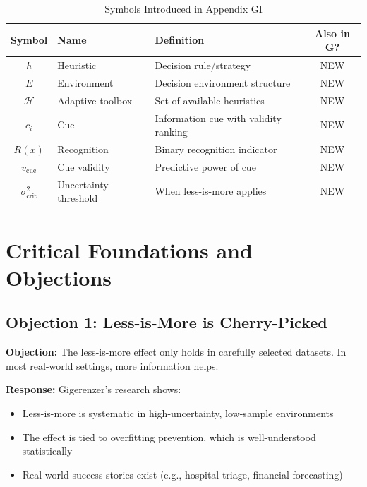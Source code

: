 \vspace{0.5em}

\begin{table}[htbp]
\centering
\caption{Symbols Introduced in Appendix GI}
\label{tab:gi-symbols}
\renewcommand{\arraystretch}{1.3}
\begin{tabular}{@{}clp{6cm}c@{}}
\toprule
\textbf{Symbol} & \textbf{Name} & \textbf{Definition} & \textbf{Also in G?} \\
\midrule
$h$ & Heuristic & Decision rule/strategy & NEW \\
$E$ & Environment & Decision environment structure & NEW \\
$\mathcal{H}$ & Adaptive toolbox & Set of available heuristics & NEW \\
$c_i$ & Cue & Information cue with validity ranking & NEW \\
$R(x)$ & Recognition & Binary recognition indicator & NEW \\
$v_{\text{cue}}$ & Cue validity & Predictive power of cue & NEW \\
$\sigma^2_{\text{crit}}$ & Uncertainty threshold & When less-is-more applies & NEW \\
\bottomrule
\end{tabular}
\end{table}


\section{Critical Foundations and Objections}
\label{sec:gi-foundations}

\subsection{Objection 1: Less-is-More is Cherry-Picked}

\textbf{Objection:} The less-is-more effect only holds in carefully selected datasets. In most real-world settings, more information helps.

\textbf{Response:} Gigerenzer's research shows:
\begin{itemize}[nosep]
\item Less-is-more is systematic in high-uncertainty, low-sample environments
\item The effect is tied to overfitting prevention, which is well-understood statistically
\item Real-world success stories exist (e.g., hospital triage, financial forecasting)
\end{itemize}

